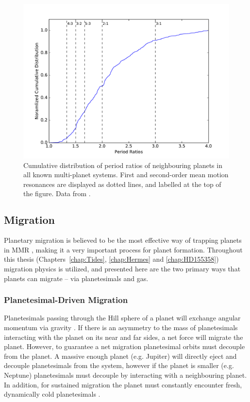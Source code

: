 \begin{figure}
\centering
\includegraphics[width=1.00\textwidth]{intro/PeriodRatios}
\caption{
Cumulative distribution of period ratios of neighbouring planets in all known multi-planet systems.
 First and second-order mean motion resonances are displayed as dotted lines, and labelled at the top of the figure. 
 Data from \citet{NASAEA}.}
\label{fig:KepMMR}
\end{figure}

\subsection{Migration}
\label{sec:migration}
Planetary migration is believed to be the most effective way of trapping planets in MMR \citep[e.g.][]{Lee2002}, making it a very important process for planet formation.  
Throughout this thesis (Chapters~\ref{chap:Tides}, \ref{chap:Hermes} and \ref{chap:HD155358}) migration physics is utilized, and presented here are the two primary ways that planets can migrate -- via planetesimals and gas.

\subsubsection{Planetesimal-Driven Migration}
Planetesimals passing through the Hill sphere of a planet will exchange angular momentum via gravity \citep{Ida2000, Kirsh2009}.
If there is an asymmetry to the mass of planetesimals interacting with the planet on its near and far sides, a net force will migrate the planet. 
However, to guarantee a net migration planetesimal orbits must decouple from the planet. 
A massive enough planet (e.g. Jupiter) will directly eject and decouple planetesimals from the system, however if the planet is smaller (e.g. Neptune) planetesimals must decouple by interacting with a neighbouring planet. 
In addition, for sustained migration the planet must constantly encounter fresh, dynamically cold planetesimals \citep{Gomes2004}.  


